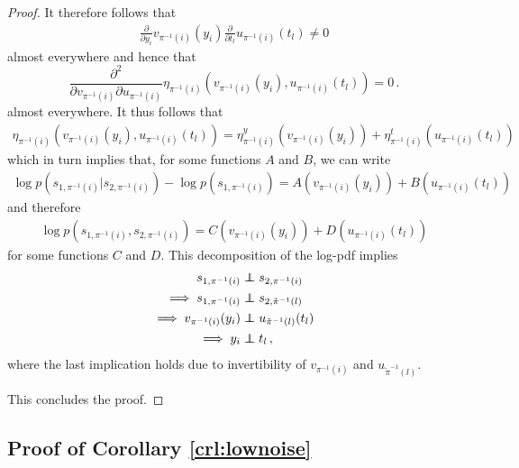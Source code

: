\begin{proof}
	It therefore follows that
	\begin{align*}
	\frac{\partial}{\partial y_i}v_{\pi^{-1}(i)}(y_i) \frac{\partial }{\partial t_l} u_{\pi^{-1}(i)}(t_l) \neq 0
	\end{align*}
	almost everywhere and hence that
	\begin{equation}
	\frac{\partial^2}{\partial v_{\pi^{-1}(i)} \partial u_{\pi^{-1}(i)}} \eta_{\pi^{-1}(i)}(v_{\pi^{-1}(i)}(y_i), u_{\pi^{-1}(i)}(t_l)) = 0\,. \label{eq:additive_eta}
	\end{equation}
	almost everywhere.
	It thus follows that
	\begin{align*}
	\eta_{\pi^{-1}(i)}(v_{\pi^{-1}(i)}(y_i), u_{\pi^{-1}(i)}(t_l)) = \eta_{\pi^{-1}(i)}^y(v_{\pi^{-1}(i)}(y_i))+ \eta_{\pi^{-1}(i)}^t(u_{\pi^{-1}(i)}(t_l))
	\end{align*}
	which in turn implies that, for some functions $A$ and $B$, we can write
	\begin{align*}
	\log p(s_{1, \pi^{-1}(i)}|s_{2, \pi^{-1}(i)}) - \log p(s_{1, \pi^{-1}(i)}) = A(v_{\pi^{-1}(i)}(y_i)) + B(u_{\pi^{-1}(i)}(t_l))
	\end{align*}
	and therefore
	\begin{align*}
	\log p(s_{1, \pi^{-1}(i)},s_{2, \pi^{-1}(i)}) = C(v_{\pi^{-1}(i)}(y_i)) + D(u_{\pi^{-1}(i)}(t_l))
	\end{align*}
	for some functions $C$ and $D$. This decomposition of the log-pdf implies
	\begin{align*}
	s_{1, \pi^{-1}(i)} &\independent s_{2, \pi^{-1}(i)}\\
	\implies s_{1, \pi^{-1}(i)} &\independent s_{2, \tilde{\pi}^{-1}(l)}  \\
	\implies v_{\pi^{-1}(i)}(y_i)  &\independent u_{\tilde{\pi}^{-1}(l)}(t_l) \\
	\implies y_i  &\independent t_l \,,
	\end{align*}
	where the last implication holds due to invertibility of $v_{\pi^{-1}(i)}$ and $u_{\tilde{\pi}^{-1}(l)}$.
	
	This concludes the proof.
	
\end{proof}

\subsection{Proof of Corollary \ref{crl:lownoise}}
\label{appendix:thm2}


